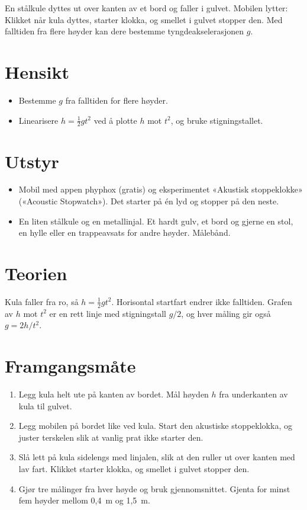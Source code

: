 \documentclass[11pt]{article}
\begin{document}

En stålkule dyttes ut over kanten av et bord og faller i gulvet. Mobilen lytter: Klikket når kula dyttes, starter klokka, og smellet i gulvet stopper den. Med falltiden fra flere høyder kan dere bestemme tyngdeakselerasjonen $g$.

\section*{Hensikt}

\begin{itemize}
\item Bestemme $g$ fra falltiden for flere høyder.
\item Linearisere $h = \tfrac{1}{2}gt^{2}$ ved å plotte $h$ mot $t^{2}$, og bruke stigningstallet.
\end{itemize}

\section*{Utstyr}

\begin{itemize}
\item Mobil med appen phyphox (gratis) og eksperimentet «Akustisk stoppeklokke» («Acoustic Stopwatch»). Det starter på én lyd og stopper på den neste.
\item En liten stålkule og en metallinjal. Et hardt gulv, et bord og gjerne en stol, en hylle eller en trappeavsats for andre høyder. Målebånd.
\end{itemize}

\section*{Teorien}

Kula faller fra ro, så $h = \tfrac{1}{2}gt^{2}$. Horisontal startfart endrer ikke falltiden. Grafen av $h$ mot $t^{2}$ er en rett linje med stigningstall $g/2$, og hver måling gir også $g = 2h/t^{2}$.

\section*{Framgangsmåte}

\begin{enumerate}
\item Legg kula helt ute på kanten av bordet. Mål høyden $h$ fra underkanten av kula til gulvet.
\item Legg mobilen på bordet like ved kula. Start den akustiske stoppeklokka, og juster terskelen slik at vanlig prat ikke starter den.
\item Slå lett på kula sidelengs med linjalen, slik at den ruller ut over kanten med lav fart. Klikket starter klokka, og smellet i gulvet stopper den.
\item Gjør tre målinger fra hver høyde og bruk gjennomsnittet. Gjenta for minst fem høyder mellom 0,4~m og 1,5~m.
\end{enumerate}
\end{document}
